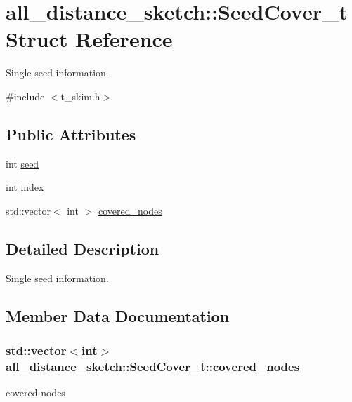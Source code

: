 \hypertarget{structall__distance__sketch_1_1SeedCover__t}{}\section{all\+\_\+distance\+\_\+sketch\+:\+:Seed\+Cover\+\_\+t Struct Reference}
\label{structall__distance__sketch_1_1SeedCover__t}


Single seed information.  




{\ttfamily \#include $<$t\+\_\+skim.\+h$>$}

\subsection*{Public Attributes}
\begin{DoxyCompactItemize}
\item 
int \hyperlink{structall__distance__sketch_1_1SeedCover__t_af8100e6ff9b3830e0b40e395cbaeff4b}{seed}
\item 
int \hyperlink{structall__distance__sketch_1_1SeedCover__t_ac11aa27c1be296bb17310c16790f88f5}{index}
\item 
std\+::vector$<$ int $>$ \hyperlink{structall__distance__sketch_1_1SeedCover__t_aec4575ff1b61bc5684301089db0acbe7}{covered\+\_\+nodes}
\end{DoxyCompactItemize}


\subsection{Detailed Description}
Single seed information. 



\subsection{Member Data Documentation}
\hypertarget{structall__distance__sketch_1_1SeedCover__t_aec4575ff1b61bc5684301089db0acbe7}{}
\subsubsection[{covered\+\_\+nodes}]{\setlength{\rightskip}{0pt plus 5cm}std\+::vector$<$int$>$ all\+\_\+distance\+\_\+sketch\+::\+Seed\+Cover\+\_\+t\+::covered\+\_\+nodes}\label{structall__distance__sketch_1_1SeedCover__t_aec4575ff1b61bc5684301089db0acbe7}
covered nodes \hypertarget{structall__distance__sketch_1_1SeedCover__t_ac11aa27c1be296bb17310c16790f88f5}{}
